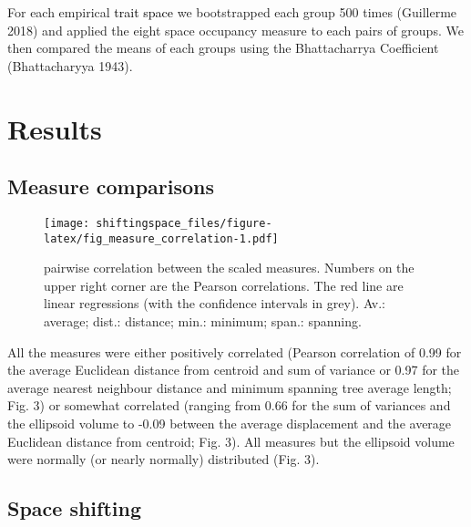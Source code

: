 \documentclass[]{article}
\begin{document}
\renewcommand\baselinestretch{1.6}\selectfont

For each empirical \textcolor{black}{trait space} we
bootstrapped each group 500 times (Guillerme 2018) and applied the eight
space occupancy measure to each pairs of groups. We then compared the
means of each groups using the Bhattacharrya Coefficient (Bhattacharyya
1943).

\section{Results}\label{results}

\subsection{Measure comparisons}\label{measure-comparisons-1}

\renewcommand\baselinestretch{1}\selectfont


\begin{figure}
\centering
\texttt{[image: shiftingspace\_files/figure-latex/fig\_measure\_correlation-1.pdf]}
\caption{pairwise correlation between the scaled measures.
Numbers on the upper right corner are the Pearson correlations. The red
line are linear regressions (with the confidence intervals in grey).
Av.: average; dist.: distance; min.: minimum; span.: spanning.}
\end{figure}

\renewcommand\baselinestretch{1.6}\selectfont


All the measures were either positively correlated (Pearson correlation
of 0.99 for the average Euclidean distance from centroid and sum of
variance or 0.97 for the average nearest neighbour distance and minimum
spanning tree average length; Fig. 3) or somewhat correlated (ranging
from 0.66 for the sum of variances and the ellipsoid volume to -0.09
between the average displacement and the average Euclidean distance from
centroid; Fig. 3). All measures but the ellipsoid volume were normally
(or nearly normally) distributed (Fig. 3).

\subsection{Space shifting}\label{space-shifting}

\renewcommand\baselinestretch{1}\selectfont
\end{document}
